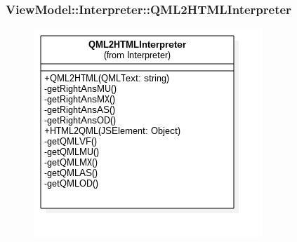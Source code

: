 \subsubsection{ViewModel::Interpreter::QML2HTMLInterpreter}
\begin{figure}[h!]
\begin{center}
	\includegraphics[scale=0.4]{../images/ViewModel/Interpreter/QML2HTMLInterpreter.png}
\end{center}
\end{figure}
